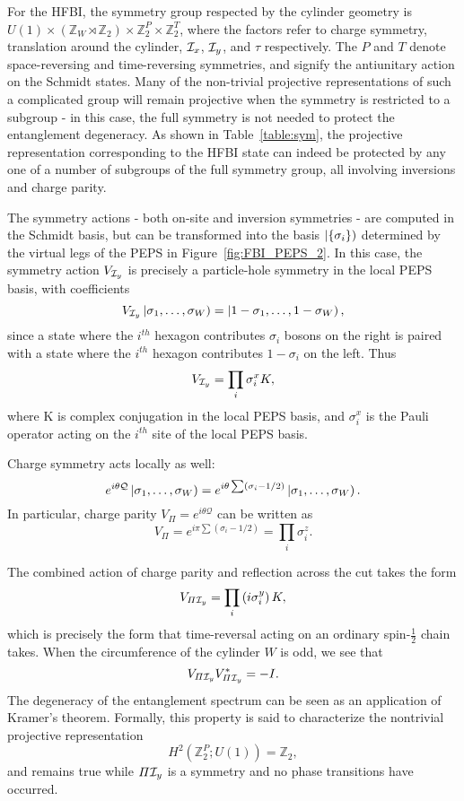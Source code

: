 For the HFBI, the symmetry group respected by the cylinder geometry is
$U(1) \times (\mathbb{Z}_W \rtimes \mathbb{Z}_2)
\times \mathbb{Z}_2^P \times \mathbb{Z}_2^T$, where the factors refer to charge
symmetry, translation around the cylinder, $\mathcal{I}_x$, $\mathcal{I}_y$, and $\tau$ respectively.
The $P$ and $T$ denote space-reversing and time-reversing symmetries, and signify the 
antiunitary action on the Schmidt states. 
Many of the non-trivial projective
representations of such a complicated group will remain projective when the symmetry is
restricted to a subgroup - in this case, the full symmetry is not needed to protect the 
entanglement degeneracy. As shown in Table~\ref{table:sym}, the projective representation 
corresponding to the HFBI state can indeed be protected by any one of a number of subgroups 
of the full symmetry group, all involving inversions and charge parity.

The symmetry actions - both on-site and inversion symmetries -
are computed in the Schmidt basis, but can be transformed
into the basis $\left |\{\sigma_i\} \right )$ determined by the virtual legs of the PEPS in
Figure~\ref{fig:FBI_PEPS_2}. 
In this case, the symmetry action $V_{\mathcal{I}_y}$ is precisely
a particle-hole symmetry in the local PEPS basis, with coefficients
$$
V_{\mathcal{I}_y}\left |\sigma_1, \ldots, \sigma_{W} \right ) = \left |1-\sigma_1, \ldots, 1-\sigma_{W} \right ), 
$$
since a state where the $i^{th}$ hexagon contributes $\sigma_i$ bosons on the right is paired with
a state where the $i^{th}$ hexagon contributes $1-\sigma_i$ on the left.
Thus 
$$
V_{\mathcal{I}_y} = \prod\limits_i \sigma_i^x K,
$$
where K is complex conjugation in the local PEPS basis, and $\sigma_i^x$ is the Pauli
operator acting on the $i^{th}$ site of the local PEPS basis.

Charge symmetry acts locally as well:
$$
e^{i \theta \mathcal{Q}}\left |\sigma_1, \ldots, \sigma_{W} \right ) = e^{i \theta \sum(\sigma_i-1/2)}\left |\sigma_1, \ldots, \sigma_{W} \right ).
$$
In particular, charge parity $V_{\varPi} = e^{i \theta \mathcal{Q}}$ can be written as
$$V_{\varPi} = e^{i \pi \sum(\sigma_i - 1/2)} = \prod\limits_i \sigma_i^z.$$

The combined action of charge parity and reflection across the cut takes the form 
$$
V_{\varPi \mathcal{I}_y} = \prod\limits_i \left(i \sigma_i^y \right) K,
$$
which is precisely the form that time-reversal acting on an ordinary spin-$\frac12$ chain takes.
When the circumference of the cylinder $W$ is odd, we see that
$$V_{\varPi \mathcal{I}_y}V_{\varPi \mathcal{I}_y}^{*} = -I.$$ 
The degeneracy of the entanglement spectrum can be seen as an application of Kramer's theorem.
Formally, this property is said to characterize the nontrivial projective representation
$$
H^2(\mathbb{Z}_2^P; U(1)) = \mathbb{Z}_2,
$$
and remains true while $\varPi \mathcal{I}_y$ is a symmetry and no phase transitions have occurred.

